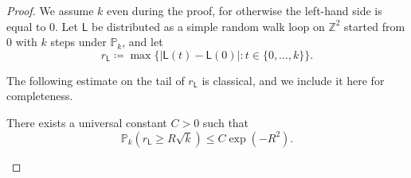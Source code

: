 \documentclass[10pt,a4paper]{amsart}
\begin{document}
\begin{proof}
    We assume $k$ even during the proof, for otherwise the left-hand side is equal to $0$.
    Let $\mathsf{L}$ be distributed as a simple random walk loop on $\mathbb{Z}^2$ started from $0$ with $k$ steps under $\mathbb{P}_{k}$, and let
    \[r_\mathsf{L}\coloneqq \max \{ |\mathsf{L}(t)-\mathsf{L}(0)|:   t\in \{0,\dots, k\} \}.\]
    
    
    The following estimate on the tail of $r_\mathsf{L}$ is classical, and we include it here for completeness. 
    
    
\begin{lemma}\label{L:ex_hoeffding} There exists a universal constant $C>0$ such that 
    \begin{equation} 
    \label{eq:temp:hoef}
    \mathbb{P}_k( r_{\mathsf{L}} \geq R \sqrt{k} ) \leq C \exp(-R^2).
    \end{equation}
\end{lemma}


\end{proof}
\end{document}
